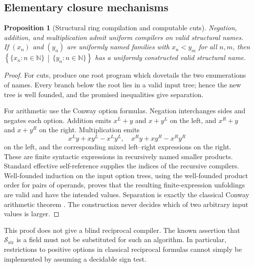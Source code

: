 \documentclass[11pt,letterpaper]{article}
\numberwithin{equation}{section}
\newtheorem{proposition}[theorem]{Proposition}
\theoremstyle{definition}
\theoremstyle{remark}
\newcommand{\Sc}{\mathcal S_{\mathrm{str}}}
\newcommand{\N}{\mathbb N}
\newcommand{\cut}[2]{\left\{#1\,\middle|\,#2\right\}}
\begin{document}
\subsection{Elementary closure mechanisms}

\begin{proposition}[Structural ring compilation and computable cuts]
\label{prop:structring}
Negation, addition, and multiplication admit uniform compilers on valid
structural names. If $(x_n)$ and $(y_n)$ are uniformly named families with
$x_n<y_m$ for all $n,m$, then $\cut{\{x_n:n\in\N\}}{\{y_n:n\in\N\}}$
has a uniformly constructed valid structural name.
\end{proposition}
\begin{proof}
For cuts, produce one root program which dovetails the two enumerations of
names. Every branch below the root lies in a valid input tree; hence the
new tree is well founded, and the promised inequalities give separation.

For arithmetic use the Conway option formulas. Negation interchanges sides
and negates each option. Addition emits $x^L+y$ and $x+y^L$ on the left,
and $x^R+y$ and $x+y^R$ on the right. Multiplication emits
\[
 x^Ly+xy^L-x^Ly^L,\quad x^Ry+xy^R-x^Ry^R
\]
on the left, and the corresponding mixed left--right expressions on the
right. These are finite syntactic expressions in recursively named smaller
products. Standard effective self-reference supplies the indices of the
recursive compilers. Well-founded induction on the input option trees,
using the well-founded product order for pairs of operands, proves that the
resulting finite-expression unfoldings are valid and have the intended
values. Separation is exactly the classical Conway arithmetic theorem
\cite{conway}. The construction never decides which of two arbitrary input
values is larger.
\end{proof}

This proof does not give a blind reciprocal compiler. The known assertion
that $\Sc$ is a field must not be substituted for such an algorithm. In
particular, restrictions to positive options in classical reciprocal
formulas cannot simply be implemented by assuming a decidable sign test.
\end{document}
